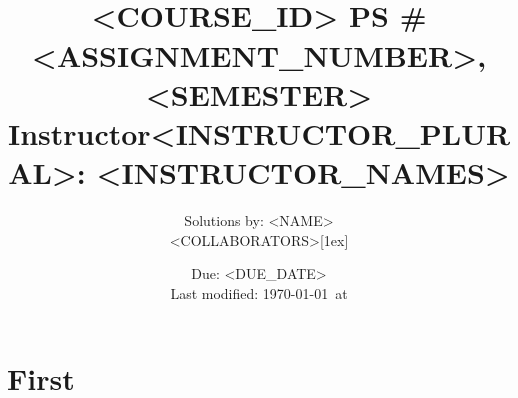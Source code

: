 \documentclass[11pt]{article}
\title{\mbox{}\\[-8ex]<COURSE_ID> PS \#<ASSIGNMENT_NUMBER>, <SEMESTER>\\\normalsize
Instructor<INSTRUCTOR_PLURAL>: <INSTRUCTOR_NAMES>\\[-2.5ex]}
\author{Solutions by: <NAME>\\<COLLABORATORS>[1ex]}
\date{Due: <DUE_DATE>\\
Last modified: \today\, at \currenttime}
\begin{document}

\maketitle

\vspace{-3ex}%

\noindent

\section{First}


\end{document}
